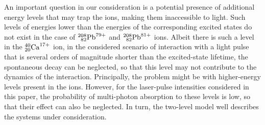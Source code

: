 An important question in our consideration is a potential presence of additional energy levels that may trap the ions, making them inaccessible to light. Such levels of energies lower than the energies of the corresponding excited states do not exist in the case of $^{208}_{\phantom{0}82}{\rm Pb}^{79+}$ and $^{208}_{\phantom{0}82}{\rm Pb}^{81+}$ ions. Albeit there is such a level in the $^{40}_{20}{\rm Ca}^{17+}$ ion, in the considered scenario of interaction with a light pulse that is several orders of magnitude shorter than the excited-state lifetime, the spontaneous decay can be neglected, so that this level may not contribute to the dynamics of the interaction. Principally, the problem might be with higher-energy levels present in the ions. However, for the laser-pulse intensities considered in this paper, the probability of multi-photon absorption to these levels is low, so that their effect can also be neglected. In turn, the two-level model well describes the systems under consideration.